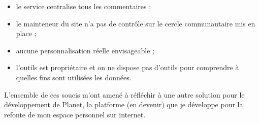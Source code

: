\documentclass[a4paper,10pt]{article}
\begin{document}
\begin{itemize}
\item le service centralise tous les commentaires ;
\item le mainteneur du site n'a pas de contrôle sur le cercle communautaire mis en place ;
\item aucune personnalisation réelle envisageable ;
\item l'outils est propriétaire et on ne dispose pas d'outils pour comprendre à quelles
  fins sont utilisées les données.\\
\end{itemize}

L'ensemble de ces soucis m'ont amené à réfléchir à une autre solution pour le développement
de Planet\cite{planet}, la platforme (en devenir) que je développe pour la refonte
de mon espace personnel sur internet.

\newpage


\end{document}
